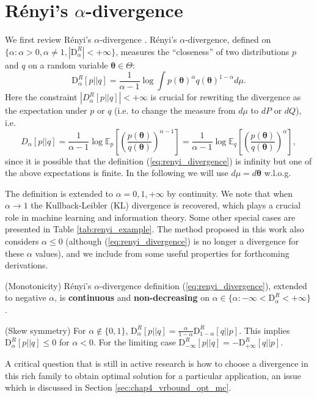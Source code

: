 \section{R{\'e}nyi's $\alpha$-divergence}

\label{sec:chap4_vrbound_renyi_divergence}
We first review R{\'e}nyi's $\alpha$-divergence \citep{renyi:divergence1961, van_erven:renyi2014}. R{\'e}nyi's $\alpha$-divergence, defined on $\{\alpha: \alpha > 0, \alpha \neq 1, |\mathrm{D}_{\alpha}^{R}| < +\infty \}$, measures the ``closeness'' of two distributions $p$ and $q$ on a random variable $\bm{\theta} \in \Theta$:
\begin{equation}
\label{eq:renyi_divergence}
\mathrm{D}_{\alpha}^{R} [p || q] = \frac{1}{\alpha - 1} \log \int p(\bm{\theta})^{\alpha} q(\bm{\theta})^{1 - \alpha} d \mu.
\end{equation}
Here the constraint $|D^{R}_{\alpha}[p||q]| < +\infty$ is crucial for rewriting the divergence as the expectation under $p$ or $q$ (i.e. to change the measure from $d\mu$ to $dP$ or $dQ$), i.e. 
$$D_{\alpha}[p||q] = \frac{1}{\alpha - 1} \log \mathbb{E}_{p} \left[ \left( \frac{p(\bm{\theta})}{q(\bm{\theta})}   \right)^{\alpha - 1} \right] = \frac{1}{\alpha - 1} \log \mathbb{E}_{q} \left[ \left( \frac{p(\bm{\theta})}{q(\bm{\theta})}   \right)^{\alpha} \right],$$
since it is possible that the definition (\ref{eq:renyi_divergence}) is infinity but one of the above expectations is finite. In the following we will use $d\mu = d\bm{\theta}$ w.l.o.g.

The definition is extended to $\alpha = 0, 1, +\infty$ by continuity. We note that when $\alpha \rightarrow 1$ the Kullback-Leibler (KL) divergence is recovered, which plays a crucial role in machine learning and information theory. Some other special cases are presented in Table \ref{tab:renyi_example}. The method proposed in this work also considers $\alpha \leq 0$ (although (\ref{eq:renyi_divergence}) is no longer a divergence for these $\alpha$ values), and we include from \cite{van_erven:renyi2014} some useful properties for forthcoming derivations.
%
\begin{prop}
(Monotonicity) R{\'e}nyi's $\alpha$-divergence definition (\ref{eq:renyi_divergence}), extended to negative $\alpha$, is \textbf{continuous} and \textbf{non-decreasing} on $\alpha \in \{\alpha: -\infty < \mathrm{D}_{\alpha}^{R} < +\infty \}$.
\label{prop:renyi_divergence}
\end{prop}
%
\begin{prop}
(Skew symmetry) For $\alpha \not\in \{0, 1\}$, 
$
\mathrm{D}_{\alpha}^{R} [p || q] = \frac{\alpha}{1 - \alpha} \mathrm{D}_{1 - \alpha}^{R} [q || p].
$
This implies $\mathrm{D}_{\alpha}^{R} [p || q] \leq 0$ for $\alpha < 0$. For the limiting case $\mathrm{D}_{-\infty}^{R} [p || q] = -\mathrm{D}_{+\infty}^{R} [q || p]$.
\label{prop:skew_symmetry}
\end{prop}
%
%

%
A critical question that is still in active research is how to choose a divergence in this rich family to obtain optimal solution for a particular application, an issue which is discussed in Section \ref{sec:chap4_vrbound_opt_mc}.